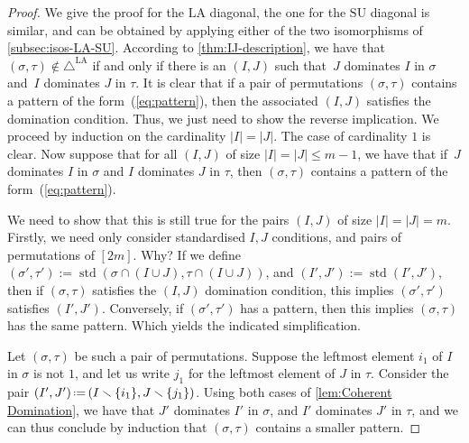 \documentclass{amsart}
\theoremstyle{definition}
\newcommand{\ssm}{\smallsetminus} %
\newcommand{\eqdef}{\mbox{\,\raisebox{0.2ex}{\scriptsize\ensuremath{\mathrm:}}\ensuremath{=}\,}} %
\DeclareMathOperator{\std}{std}
\newcommand{\SU}{\mathrm{SU}}
\newcommand{\LA}{\mathrm{LA}}
\newcommand{\LAD}{\triangle^{\mathrm{LA}}}
\begin{document}
\begin{proof}
We give the proof for the $\LA$ diagonal, the one for the $\SU$ diagonal is similar, and can be obtained by applying either of the two isomorphisms of \cref{subsec:isos-LA-SU}.
According to \cref{thm:IJ-description}, we have that $(\sigma,\tau) \notin \LAD$ if and only if there is an $(I,J)$ such that~$J$ dominates $I$ in $\sigma$ and~$I$ dominates $J$ in $\tau$.
It is clear that if a pair of permutations $(\sigma,\tau)$ contains a pattern of the form~(\ref{eq:pattern}), then the associated $(I,J)$ satisfies the domination condition.
Thus, we just need to show the reverse implication. 
We proceed by induction on the cardinality $|I|=|J|$. 
The case of cardinality $1$ is clear. 
Now suppose that for all $(I,J)$ of size $|I|=|J|\leq m-1$, we have that if~$J$ dominates $I$ in $\sigma$ and $I$ dominates $J$ in $\tau$, then $(\sigma,\tau)$ contains a pattern of the form~(\ref{eq:pattern}).

We need to show that this is still true for the pairs $(I,J)$ of size $|I|=|J|=m$.
Firstly, we need only consider standardised $I,J$ conditions, and pairs of permutations of $[2m]$.
Why?
If we define $(\sigma',\tau') := \std(\sigma \cap (I\cup J),\tau \cap (I\cup J))$, and $(I',J'):=\std(I',J')$, 
then if $(\sigma,\tau)$ satisfies the $(I,J)$ domination condition, this implies $(\sigma',\tau')$ satisfies $(I',J')$.
Conversely, if $(\sigma',\tau')$ has a pattern, then this implies $(\sigma,\tau)$ has the same pattern.
Which yields the indicated simplification.

Let $(\sigma,\tau)$ be such a pair of permutations.
Suppose the leftmost element $i_1$ of $I$ in $\sigma$ is not $1$, and let us write $j_1$ for the leftmost element of $J$ in $\tau$.
Consider the pair ${(I',J') \eqdef (I\ssm \{i_1\}, J \ssm \{j_1\})}$.
Using both cases of \cref{lem:Coherent Domination}, we have that $J'$ dominates $I'$ in $\sigma$, and $I'$ dominates $J'$ in $\tau$, and we can thus conclude by induction that $(\sigma,\tau)$ contains a smaller pattern.


\end{proof}
\end{document}
